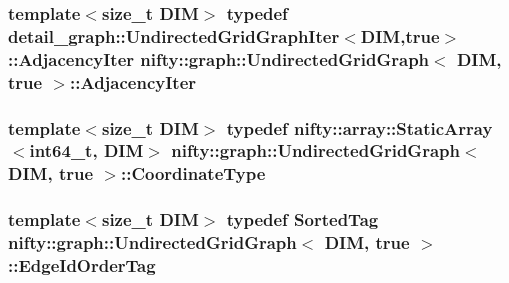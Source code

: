 \subsubsection[{Adjacency\+Iter}]{\setlength{\rightskip}{0pt plus 5cm}template$<$size\+\_\+t D\+I\+M$>$ typedef {\bf detail\+\_\+graph\+::\+Undirected\+Grid\+Graph\+Iter}$<$D\+I\+M,true$>$\+::{\bf Adjacency\+Iter} {\bf nifty\+::graph\+::\+Undirected\+Grid\+Graph}$<$ D\+I\+M, true $>$\+::{\bf Adjacency\+Iter}}\label{classnifty_1_1graph_1_1UndirectedGridGraph_3_01DIM_00_01true_01_4_a9779969eb8762908d43eab3d9d3b17b1}
\hypertarget{classnifty_1_1graph_1_1UndirectedGridGraph_3_01DIM_00_01true_01_4_a45f38cce72559c7bdefa3d219486bae4}{}
\subsubsection[{Coordinate\+Type}]{\setlength{\rightskip}{0pt plus 5cm}template$<$size\+\_\+t D\+I\+M$>$ typedef {\bf nifty\+::array\+::\+Static\+Array}$<$int64\+\_\+t, D\+I\+M$>$ {\bf nifty\+::graph\+::\+Undirected\+Grid\+Graph}$<$ D\+I\+M, true $>$\+::{\bf Coordinate\+Type}}\label{classnifty_1_1graph_1_1UndirectedGridGraph_3_01DIM_00_01true_01_4_a45f38cce72559c7bdefa3d219486bae4}
\hypertarget{classnifty_1_1graph_1_1UndirectedGridGraph_3_01DIM_00_01true_01_4_aca991599ad4c8532f2d07ed7bc507449}{}
\subsubsection[{Edge\+Id\+Order\+Tag}]{\setlength{\rightskip}{0pt plus 5cm}template$<$size\+\_\+t D\+I\+M$>$ typedef {\bf Sorted\+Tag} {\bf nifty\+::graph\+::\+Undirected\+Grid\+Graph}$<$ D\+I\+M, true $>$\+::{\bf Edge\+Id\+Order\+Tag}}\label{classnifty_1_1graph_1_1UndirectedGridGraph_3_01DIM_00_01true_01_4_aca991599ad4c8532f2d07ed7bc507449}
\hypertarget{classnifty_1_1graph_1_1UndirectedGridGraph_3_01DIM_00_01true_01_4_a0d9a24c893bf3f5f0cd61873bb77dfe1}{}
